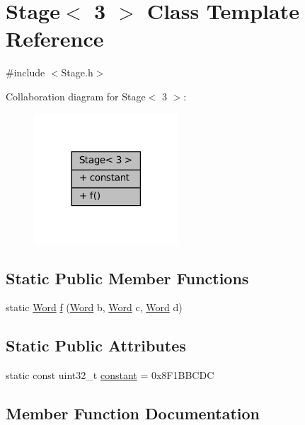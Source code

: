 \hypertarget{class_stage_3_013_01_4}{}\section{Stage$<$ 3 $>$ Class Template Reference}
\label{class_stage_3_013_01_4}


{\ttfamily \#include $<$Stage.\+h$>$}



Collaboration diagram for Stage$<$ 3 $>$\+:
\nopagebreak
\begin{figure}[H]
\begin{center}
\leavevmode
\includegraphics[width=153pt]{class_stage_3_013_01_4__coll__graph}
\end{center}
\end{figure}
\subsection*{Static Public Member Functions}
\begin{DoxyCompactItemize}
\item 
static \mbox{\hyperlink{class_word}{Word}} \mbox{\hyperlink{class_stage_3_013_01_4_a229422e503008e1fe0622120f1671bea}{f}} (\mbox{\hyperlink{class_word}{Word}} b, \mbox{\hyperlink{class_word}{Word}} c, \mbox{\hyperlink{class_word}{Word}} d)
\end{DoxyCompactItemize}
\subsection*{Static Public Attributes}
\begin{DoxyCompactItemize}
\item 
static const uint32\+\_\+t \mbox{\hyperlink{class_stage_3_013_01_4_acce4d5c568e6fc7fa7083186da79d378}{constant}} = 0x8\+F1\+B\+B\+C\+DC
\end{DoxyCompactItemize}


\subsection{Member Function Documentation}
\mbox{\label{class_stage_3_013_01_4_a229422e503008e1fe0622120f1671bea}} 
